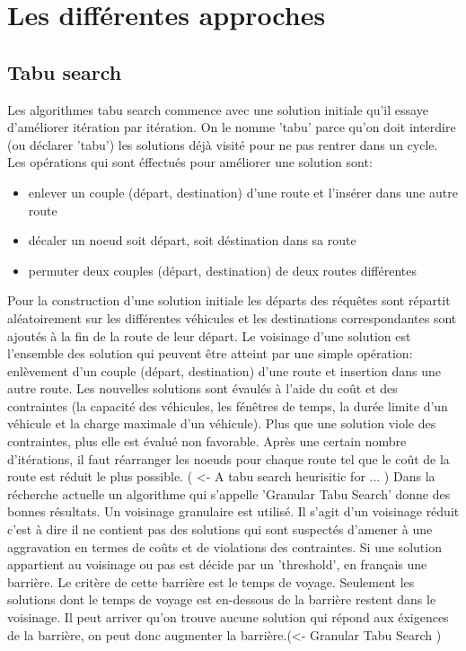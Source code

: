 \documentclass[10pt,a4paper]{report}
\begin{document}
\section*{Les différentes approches}

\subsection*{Tabu search}
Les algorithmes tabu search commence avec une solution initiale qu'il essaye d'améliorer itération par itération. On le nomme 'tabu' parce qu'on doit interdire (ou déclarer 'tabu') les solutions déjà visité pour ne pas rentrer dans un cycle. Les opérations qui sont éffectués pour améliorer une solution sont:
\begin{itemize}
\item enlever un couple (départ, destination) d'une route et l'insérer dans une autre route
\item décaler un noeud soit départ, soit déstination dans sa route
\item permuter deux couples (départ, destination) de deux routes différentes
\end{itemize}
Pour la construction d'une solution initiale les départs des réquêtes sont répartit aléatoirement sur les différentes véhicules et les destinations correspondantes sont ajoutés à la fin de la route de leur départ. Le voisinage d'une solution est l'ensemble des solution qui peuvent être atteint par une simple opération: enlèvement d'un couple (départ, destination) d'une route et insertion dans une autre route. Les nouvelles solutions sont évaulés à l'aide du coût  et des contraintes (la capacité des véhicules, les fénêtres de temps, la durée limite d'un véhicule et la charge maximale d'un véhicule). Plus que une solution viole des contraintes, plus elle est évalué non favorable. Après une certain nombre d'itérations, il faut réarranger les noeuds pour chaque route tel que le coût de la route est réduit le plus possible. ( <- A tabu search heurisitic for ... )
Dans la récherche actuelle un algorithme qui s'appelle 'Granular Tabu Search' donne des bonnes résultats. Un voisinage granulaire est utilisé. Il s'agit d'un voisinage réduit c'est à dire il ne contient pas des solutions qui sont suspectés d'amener à une aggravation en termes de coûts et de violations des contraintes. Si une solution appartient au voisinage ou pas est décide par un 'threshold', en français une barrière. Le critère de cette barrière est le temps de voyage. Seulement les solutions dont le temps de voyage est en-dessous de la barrière restent dans le voisinage. Il peut arriver qu'on trouve aucune solution qui répond aux éxigences de la barrière, on peut donc augmenter la barrière.(<- Granular Tabu Search )
\end{document}
